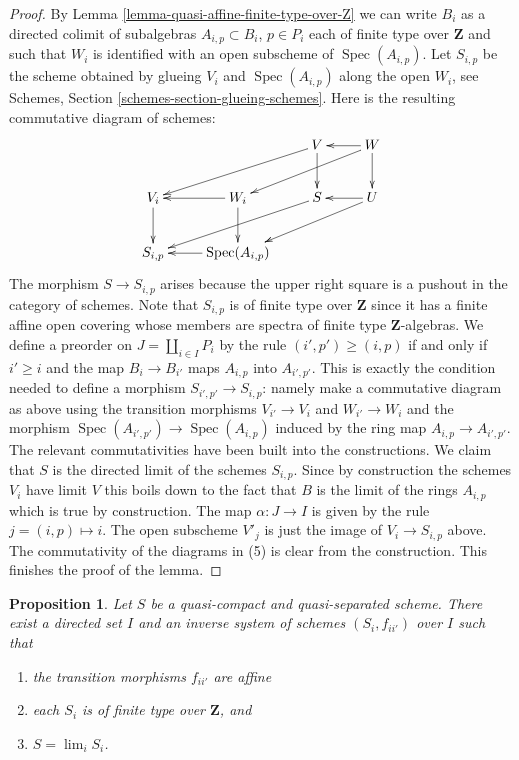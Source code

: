 \documentclass{stacks-project}
\theoremstyle{plain}
\newtheorem{proposition}[subsection]{Proposition}
\theoremstyle{definition}
\theoremstyle{remark}
\numberwithin{equation}{subsection}
\def\lim{\mathop{\mathrm{lim}}\nolimits}
\def\Spec{\mathop{\mathrm{Spec}}}
\begin{document}
\begin{proof}
\medskip\noindent
By Lemma \ref{lemma-quasi-affine-finite-type-over-Z}
we can write $B_i$ as a directed colimit of subalgebras
$A_{i, p} \subset B_i$, $p \in P_i$ each
of finite type over $\mathbf{Z}$ and such that $W_i$ is
identified with an open subscheme of $\Spec(A_{i, p})$.
Let $S_{i, p}$ be the scheme obtained by glueing
$V_i$ and $\Spec(A_{i, p})$ along the open $W_i$, see
Schemes, Section \ref{schemes-section-glueing-schemes}.
Here is the resulting commutative diagram of schemes:
$$
\xymatrix{
& & V \ar[lld] \ar[d] & W \ar[l] \ar[lld] \ar[d] \\
V_i \ar[d] & W_i \ar[l] \ar[d] & S \ar[lld] & U \ar[lld] \ar[l] \\
S_{i, p} & \Spec(A_{i, p}) \ar[l]
}
$$
The morphism $S \to S_{i, p}$ arises because the upper right
square is a pushout in the category of schemes.
Note that $S_{i, p}$ is of finite type over $\mathbf{Z}$ since
it has a finite affine open covering whose members are
spectra of finite type $\mathbf{Z}$-algebras.
We define a preorder on $J = \coprod_{i \in I} P_i$
by the rule $(i', p') \geq (i, p)$ if and only if
$i' \geq i$ and the map $B_i \to B_{i'}$ maps $A_{i, p}$ into
$A_{i', p'}$. This is exactly the condition needed to
define a morphism $S_{i', p'} \to S_{i, p}$: namely make a commutative
diagram as above using the transition morphisms $V_{i'} \to V_i$
and $W_{i'} \to W_i$ and
the morphism $\Spec(A_{i', p'}) \to \Spec(A_{i, p})$ induced
by the ring map $A_{i, p} \to A_{i', p'}$. The relevant commutativities
have been built into the constructions.
We claim that $S$ is the directed limit of the schemes $S_{i, p}$.
Since by construction the schemes $V_i$ have limit $V$ this boils
down to the fact that $B$ is the limit of the rings $A_{i, p}$
which is true by construction. The map $\alpha : J \to I$ is given
by the rule $j = (i, p) \mapsto i$. The open subscheme $V'_j$ is
just the image of $V_i \to S_{i, p}$ above. The commutativity of
the diagrams in (5) is clear from the construction.
This finishes the proof of the lemma.
\end{proof}

\begin{proposition}
\label{proposition-approximate}
Let $S$ be a quasi-compact and quasi-separated scheme.
There exist a directed set $I$
and an inverse system of schemes $(S_i, f_{ii'})$ over $I$
such that
\begin{enumerate}
\item the transition morphisms $f_{ii'}$ are affine
\item each $S_i$ is of finite type over $\mathbf{Z}$, and
\item $S = \lim_i S_i$.
\end{enumerate}
\end{proposition}
\end{document}
